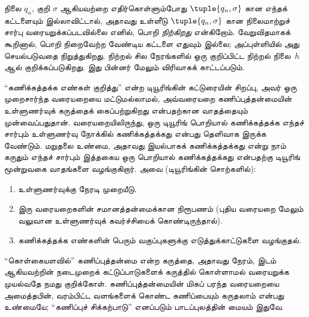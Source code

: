 \documentclass[../../../include/open-logic-section]{subfiles}
\begin{document}
\begin{explain}
நிலை $q_n$, குறி $\sigma$ ஆகியவற்றை எதிர்கொள்ளும்போது
$\tuple{q_n, \sigma}$ கான எந்தக் கட்டளையும் இல்லாவிட்டால்,
அதாவது உள்ளீடு $\tuple{q_n,\sigma}$ கான நிலைமாற்றுச் சார்பு
வரையறுக்கப்படவில்லை எனில், பொறி \emph{நிற்கிறது} என்கிறோம்.
வேறுவிதமாகக் கூறினால், பொறி நிறைவேற்ற வேண்டிய கட்டளை எதுவும்
இல்லை; அப்புள்ளியில் அது செயல்படுவதை நிறுத்துகிறது. நிற்றல் சில
நேரங்களில் ஒரு குறிப்பிட்ட நிற்றல் நிலை~$h$ ஆல் குறிக்கப்படுகிறது.
இது பின்னர் மேலும் விரிவாகக் காட்டப்படும்.
\end{explain}

\begin{digress}
``கணிக்கத்தக்க எண்கள் குறித்து'' என்ற டியூரிங்கின் கட்டுரையின்
சிறப்பு, அவர் ஒரு முறைசார்ந்த வரையறையை மட்டுமல்லாமல், அவ்வரையறை
கணிப்புத்தன்மையின் உள்ளுணர்வுக் கருத்தைக் கைப்பற்றுகிறது என்பதற்கான
வாதத்தையும் முன்வைப்பதுதான். வரையறையிலிருந்து, ஒரு டியூரிங்
பொறியால் கணிக்கத்தக்க எந்தச் சார்பும் உள்ளுணர்வு நோக்கில்
கணிக்கத்தக்கது என்பது தெளிவாக இருக்க வேண்டும். மறுதலை உண்மை,
அதாவது இயல்பாகக் கணிக்கத்தக்கது என்று நாம் கருதும் எந்தச் சார்பும்
இத்தகைய ஒரு பொறியால் கணிக்கத்தக்கது என்பதற்கு டியூரிங் மூன்றுவகை
வாதங்களை வழங்குகிறார். அவை (டியூரிங்கின் சொற்களில்):
\begin{enumerate}
\item உள்ளுணர்வுக்கு நேரடி முறையீடு.
\item இரு வரையறைகளின் சமானத்தன்மைக்கான நிரூபணம்
  (புதிய வரையறை மேலும் வலுவான உள்ளுணர்வுக் கவர்ச்சியைக் கொண்டிருந்தால்).
\item கணிக்கத்தக்க எண்களின் பெரும் வகுப்புகளுக்கு எடுத்துக்காட்டுகளை வழங்குதல்.
\end{enumerate}
``கொள்கையளவில்'' கணிப்புத்தன்மை என்ற கருத்தை, அதாவது நேரம்,
இடம் ஆகியவற்றின் நடைமுறைக் கட்டுப்பாடுகளைக் கருத்தில் கொள்ளாமல்
வரையறுக்க முயல்வதே நமது குறிக்கோள். கணிப்புத்தன்மையின் மிகப்
பரந்த வரையறையை அமைத்தபின், வரம்பிட்ட வளங்களைக் கொண்ட கணிப்பையும்
கருதலாம் என்பது உண்மையே; ``கணிப்புச் சிக்கற்பாடு'' எனப்படும்
பாடப்புலத்தின் மையம் இதுவே.
\end{digress}
\end{document}
